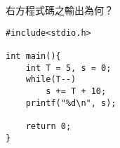 \begin{TestProblem}

\begin{multicols}{2}

右方程式碼之輸出為何？


\columnbreak

\begin{lstlisting}
#include<stdio.h>

int main(){
    int T = 5, s = 0;
    while(T--)
        s += T + 10;
    printf("%d\n", s);

    return 0;
}
\end{lstlisting}

\end{multicols}

\end{TestProblem}